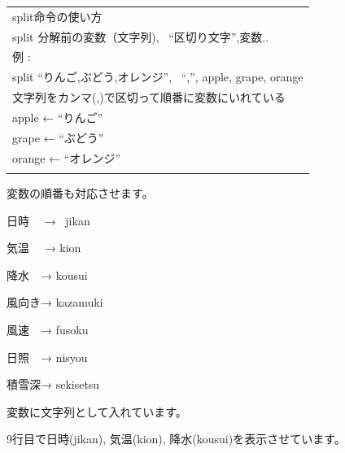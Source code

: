 






\begin{table}[htbp]
    \centering
    \begin{tabular}{|l|}
        \hline
        
        split命令の使い方\\

        split 分解前の変数（文字列), \ “区切り文字”,変数..\\
        例 : \\
        split “りんご,ぶどう,オレンジ”, \ “,”, apple, grape, orange\\
        文字列をカンマ(,)で区切って順番に変数にいれている\\

        apple ← “りんご”\\

        grape ← “ぶどう”\\

        orange ← “オレンジ”\\
        \\\hline
    \end{tabular}
\end{table}



\bigskip


\bigskip

変数の順番も対応させます。

日時 　→ \ jikan

気温　 → kion 　

降水　→ kousui

風向き→ kazamuki

風速　→ fusoku

日照　→ nisyou

積雪深→ sekisetsu

変数に文字列として入れています。


\bigskip

9行目で日時(jikan), 気温(kion),
降水(kousui)を表示させています。

